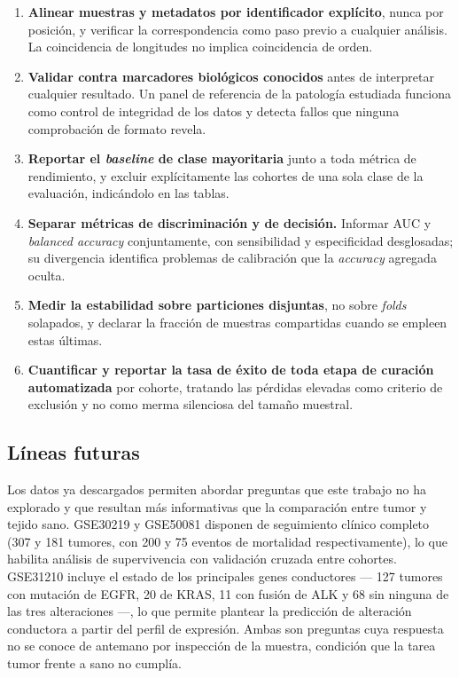 \begin{enumerate}
\item \textbf{Alinear muestras y metadatos por identificador explícito}, nunca
      por posición, y verificar la correspondencia como paso previo a cualquier
      análisis. La coincidencia de longitudes no implica coincidencia de orden.
\item \textbf{Validar contra marcadores biológicos conocidos} antes de
      interpretar cualquier resultado. Un panel de referencia de la patología
      estudiada funciona como control de integridad de los datos y detecta
      fallos que ninguna comprobación de formato revela.
\item \textbf{Reportar el \emph{baseline} de clase mayoritaria} junto a toda
      métrica de rendimiento, y excluir explícitamente las cohortes de una sola
      clase de la evaluación, indicándolo en las tablas.
\item \textbf{Separar métricas de discriminación y de decisión.} Informar AUC y
      \emph{balanced accuracy} conjuntamente, con sensibilidad y especificidad
      desglosadas; su divergencia identifica problemas de calibración que la
      \emph{accuracy} agregada oculta.
\item \textbf{Medir la estabilidad sobre particiones disjuntas}, no sobre
      \emph{folds} solapados, y declarar la fracción de muestras compartidas
      cuando se empleen estas últimas.
\item \textbf{Cuantificar y reportar la tasa de éxito de toda etapa de curación
      automatizada} por cohorte, tratando las pérdidas elevadas como criterio de
      exclusión y no como merma silenciosa del tamaño muestral.
\end{enumerate}

\subsection{Líneas futuras}
\label{sec:disc-futuro}

Los datos ya descargados permiten abordar preguntas que este trabajo no ha
explorado y que resultan más informativas que la comparación entre tumor y tejido
sano. GSE30219 y GSE50081 disponen de seguimiento clínico completo (307 y 181
tumores, con 200 y 75 eventos de mortalidad respectivamente), lo que habilita
análisis de supervivencia con validación cruzada entre cohortes. GSE31210
incluye el estado de los principales genes conductores --- 127 tumores con
mutación de EGFR, 20 de KRAS, 11 con fusión de ALK y 68 sin ninguna de las tres
alteraciones ---, lo que permite plantear la predicción de alteración
conductora a partir del perfil de expresión. Ambas son preguntas cuya respuesta
no se conoce de antemano por inspección de la muestra, condición que la tarea
tumor frente a sano no cumplía.

